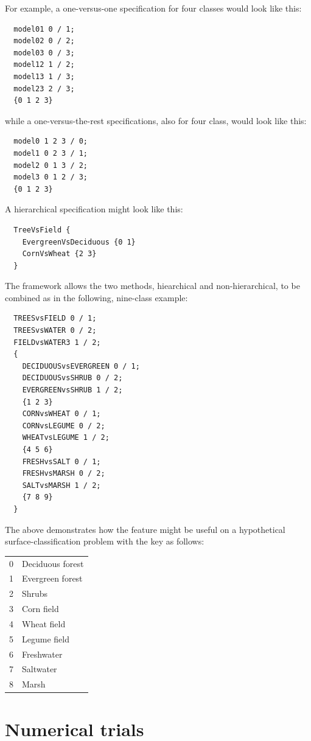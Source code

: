 \documentclass{article}
\begin{document}
For example, a one-versus-one specification for four classes would look like
this:

\begin{verbatim}
  model01 0 / 1;
  model02 0 / 2;
  model03 0 / 3;
  model12 1 / 2;
  model13 1 / 3;
  model23 2 / 3;
  {0 1 2 3}
\end{verbatim}

while a one-versus-the-rest specifications, also for four class, would look
like this:

\begin{verbatim}
  model0 1 2 3 / 0;
  model1 0 2 3 / 1;
  model2 0 1 3 / 2;
  model3 0 1 2 / 3;
  {0 1 2 3}
\end{verbatim}

A hierarchical specification might look like this:

\begin{verbatim}
  TreeVsField {
    EvergreenVsDeciduous {0 1}
    CornVsWheat {2 3}
  }
\end{verbatim}

The framework allows the two methods,
 hiearchical and non-hierarchical, 
to be combined
as in the following, nine-class example:

\begin{verbatim}
  TREESvsFIELD 0 / 1;
  TREESvsWATER 0 / 2;
  FIELDvsWATER3 1 / 2;
  {
    DECIDUOUSvsEVERGREEN 0 / 1;
    DECIDUOUSvsSHRUB 0 / 2;
    EVERGREENvsSHRUB 1 / 2;
    {1 2 3}
    CORNvsWHEAT 0 / 1;
    CORNvsLEGUME 0 / 2;
    WHEATvsLEGUME 1 / 2;
    {4 5 6}
    FRESHvsSALT 0 / 1;
    FRESHvsMARSH 0 / 2;
    SALTvsMARSH 1 / 2;
    {7 8 9}
  }
\end{verbatim}

The above demonstrates how the feature might be useful
on a hypothetical surface-classification problem with the key as follows:

\begin{tabular}{ll}
	0 & Deciduous forest \\
	1 & Evergreen forest \\
	2 & Shrubs \\
	3 & Corn field \\
	4 & Wheat field \\
	5 & Legume field \\
	6 & Freshwater \\
	7 & Saltwater \\
	8 & Marsh
\end{tabular}

\section{Numerical trials}
\end{document}
